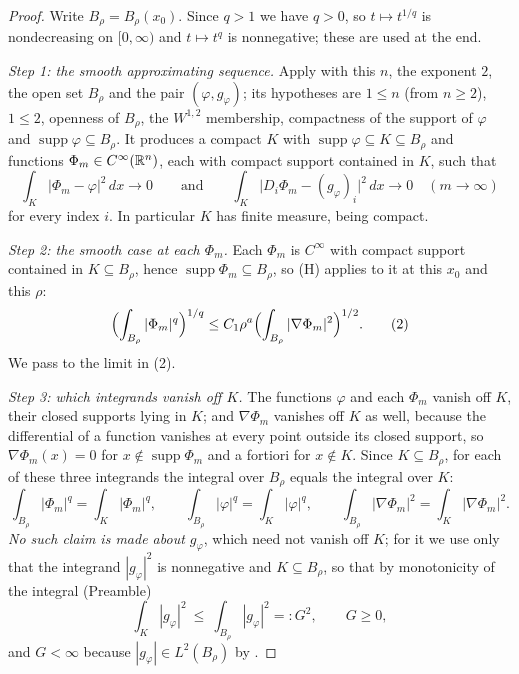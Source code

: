 \begin{proof}
Write $B_\rho=B_\rho(x_0)$.  Since $q>1$ we have $q>0$, so $t\mapsto t^{1/q}$
is nondecreasing on $[0,\infty)$ and $t\mapsto t^{q}$ is nonnegative; these are
used at the end.

\emph{Step 1: the smooth approximating sequence.}  Apply
 with this $n$, the exponent $2$, the open set
$B_\rho$ and the pair $(\varphi,g_\varphi)$; its hypotheses are $1\le n$ (from
$n\ge2$), $1\le2$, openness of $B_\rho$, the $W^{1,2}$ membership, compactness
of the support of $\varphi$ and $\operatorname{supp}\varphi\subseteq B_\rho$.
It produces a compact $K$ with
$\operatorname{supp}\varphi\subseteq K\subseteq B_\rho$ and functions
$\Phi_m\in C^\infty(\mathbb{R}^n)$, each with compact support contained in $K$, such
that
\[
\int_K|\Phi_m-\varphi|^2\,dx\to0
\qquad\text{and}\qquad
\int_K\bigl|D_i\Phi_m-(g_\varphi)_i\bigr|^2\,dx\to0
\quad(m\to\infty)
\tag{1}
\]
for every index $i$.  In particular $K$ has finite measure, being compact.

\emph{Step 2: the smooth case at each $\Phi_m$.}  Each $\Phi_m$ is $C^\infty$
with compact support contained in $K\subseteq B_\rho$, hence
$\operatorname{supp}\Phi_m\subseteq B_\rho$, so (H) applies to it at this $x_0$
and this $\rho$:
\[
\Bigl(\int_{B_\rho}|\Phi_m|^{q}\Bigr)^{1/q}
\le C_1\rho^{a}\Bigl(\int_{B_\rho}|\nabla\Phi_m|^2\Bigr)^{1/2}.
\tag{2}
\]
We pass to the limit in (2).

\emph{Step 3: which integrands vanish off $K$.}  The functions $\varphi$ and
each $\Phi_m$ vanish off $K$, their closed supports lying in $K$; and
$\nabla\Phi_m$ vanishes off $K$ as well, because the differential of a function
vanishes at every point outside its closed support, so
$\nabla\Phi_m(x)=0$ for $x\notin\operatorname{supp}\Phi_m$ and a fortiori for
$x\notin K$.  Since $K\subseteq B_\rho$, for each of these three integrands the
integral over $B_\rho$ equals the integral over $K$:
\[
\int_{B_\rho}|\Phi_m|^{q}=\int_K|\Phi_m|^{q},
\qquad
\int_{B_\rho}|\varphi|^{q}=\int_K|\varphi|^{q},
\qquad
\int_{B_\rho}|\nabla\Phi_m|^{2}=\int_K|\nabla\Phi_m|^{2}.
\tag{2a}
\]
\emph{No such claim is made about $g_\varphi$}, which need not vanish off $K$;
for it we use only that the integrand $|g_\varphi|^2$ is nonnegative and
$K\subseteq B_\rho$, so that by monotonicity of the integral (Preamble)
\[
\int_K|g_\varphi|^{2}\ \le\ \int_{B_\rho}|g_\varphi|^{2}=:G^{2},
\qquad G\ge0 ,
\tag{2b}
\]
and $G<\infty$ because $|g_\varphi|\in L^2(B_\rho)$ by .


\end{proof}
